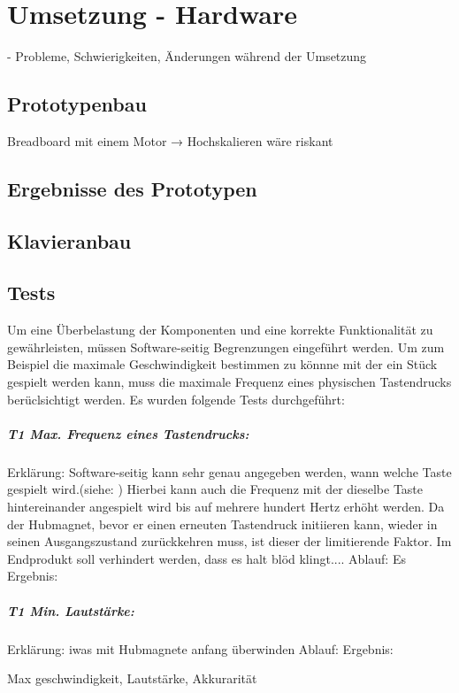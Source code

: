 \chapter{Umsetzung - Hardware} \label{umsetzung}

\nocite{*}
- Probleme, Schwierigkeiten, Änderungen während der Umsetzung

\section{Prototypenbau}
Breadboard mit einem Motor → Hochskalieren wäre riskant
\section{Ergebnisse des Prototypen}
\section{Klavieranbau}
\section{Tests}

Um eine Überbelastung der Komponenten und eine korrekte Funktionalität zu gewährleisten, müssen Software-seitig Begrenzungen eingeführt werden.
Um zum Beispiel die maximale Geschwindigkeit bestimmen zu könnne mit der ein Stück gespielt werden kann, muss die maximale Frequenz eines physischen Tastendrucks berüclsichtigt werden.
Es wurden folgende Tests durchgeführt:

\paragraph{T1 Max. Frequenz eines Tastendrucks:}
Erklärung: Software-seitig kann sehr genau angegeben werden, wann welche Taste gespielt wird.(siehe: )
Hierbei kann auch die Frequenz mit der dieselbe Taste hintereinander angespielt wird bis auf mehrere hundert Hertz erhöht werden.
Da der Hubmagnet, bevor er einen erneuten Tastendruck initiieren kann, wieder in seinen Ausgangszustand zurückkehren muss, ist dieser der limitierende Faktor.
Im Endprodukt soll verhindert werden, dass es halt blöd klingt....
Ablauf: Es
Ergebnis:

\paragraph{T1 Min. Lautstärke:}
Erklärung: iwas mit Hubmagnete anfang überwinden
Ablauf:
Ergebnis:

Max geschwindigkeit, Lautstärke, Akkurarität
